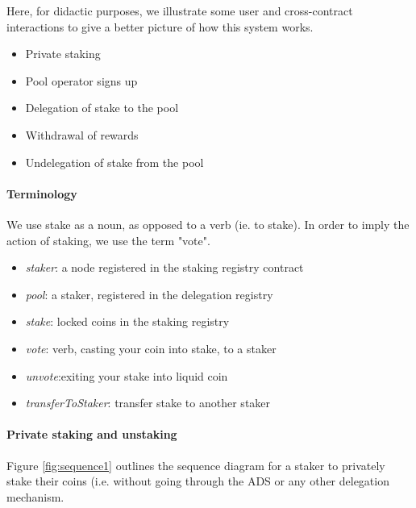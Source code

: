Here, for didactic purposes, we illustrate some user and cross-contract interactions to give a better picture of how this system works.

\begin{itemize}
    \item Private staking
    \item Pool operator signs up
    \item Delegation of stake to the pool
    \item Withdrawal of rewards
    \item Undelegation of stake from the pool
\end{itemize}

\paragraph{Terminology}
We use stake as a noun, as opposed to a verb (ie. to stake). In order to imply the action of staking, we use the term "vote". 
\begin{itemize}
    \item \textit{staker}: a node registered in the staking registry contract 
    \item \textit{pool}: a staker, registered in the delegation registry
    \item \textit{stake}: locked coins in the staking registry
    \item \textit{vote}: verb, casting your coin into stake, to a staker
    \item \textit{unvote}:exiting your stake into liquid coin
    \item \textit{transferToStaker}: transfer stake to another staker
\end{itemize}

\paragraph{Private staking and unstaking}

Figure \ref{fig:sequence1} outlines the sequence diagram for a staker to privately stake their coins (i.e. without going through the ADS or any other delegation mechanism. 

